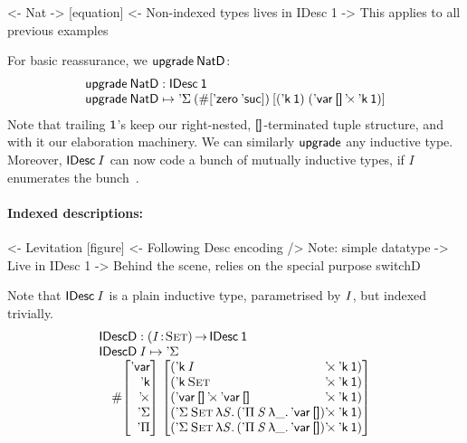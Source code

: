 \begin{wstructure}
<- Nat
    -> [equation]
    <- Non-indexed types lives in IDesc 1
        -> This applies to all previous examples
\end{wstructure}

For basic reassurance, we \(\upgrade\:\NatD\):
%
\[\stk{
\upgrade\:\NatD : \IDesc{\Unit} \\
\upgrade\:\NatD \mapsto \DSigma{(\EnumT{\sqr{\NatZero\: \SYMBNatSuc}})}
                     {\sqr{(\DConst{\Unit}) \; 
                           (\DProd{\DVar{\Void}}{\DConst{\Unit}})}}
}\]
%
Note that trailing \(\Unit\)'s keep our right-nested, \(\void\)-terminated
tuple structure, and with it our elaboration machinery.
We can similarly \(\upgrade\) any inductive type.
Moreover, \(\IDesc{I}\) can now code a bunch of mutually
inductive types, if \(I\) enumerates the
bunch~\cite{paulin:habilitation, yakushev:mutual-def}.



\paragraph{Indexed descriptions:}

\begin{wstructure}
<- Levitation [figure]
    <- Following Desc encoding
        /> Note: simple datatype
            -> Live in IDesc 1
    -> Behind the scene, relies on the special purpose switchD
\end{wstructure}

Note that $\IDesc{\V{I}}$ is a plain inductive type, parametrised
by \(\V{I}\), but indexed trivially.
%
\[\stk{
\IDescD : \PI{\V{I}}{\Set} \IDesc{\Unit} \\
\IDescD\: \V{I} \mapsto \SYMBDSigma \\
\quad
 \EnumT\vtup{r}{\SYMBDVar\\
                \SYMBDConst\\
                \DProd{}{}\\
                \SYMBDSigma\\
                \SYMBDPi}
         \; \vtup{l@{}l}{
  (\DProd{\DConst{\V{I}} &}{\DConst{\Unit}})                  \\
  (\DProd{\DConst{\Set}  &}{\DConst{\Unit}})                  \\
  (\DProd{\DVar{\Void}}{\DProd{\DVar{\Void}&}{\DConst{\Unit}}})  \\
  (\DSigma{\Set}{\LAM{\V{S}}
     \DProd{( \DPi{\V{S}}{\LAM{\_} \DVar{\Void}}) &}{\DConst{\Unit}}})     \\
  (\DSigma{\Set}{\LAM{\V{S}}
     \DProd{( \DPi{\V{S}}{\LAM{\_} \DVar{\Void}}) &}{\DConst{\Unit}}})     \\
                                   }
}\]

